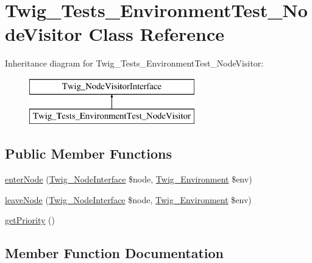 \hypertarget{classTwig__Tests__EnvironmentTest__NodeVisitor}{}\section{Twig\+\_\+\+Tests\+\_\+\+Environment\+Test\+\_\+\+Node\+Visitor Class Reference}
\label{classTwig__Tests__EnvironmentTest__NodeVisitor}
Inheritance diagram for Twig\+\_\+\+Tests\+\_\+\+Environment\+Test\+\_\+\+Node\+Visitor\+:\begin{figure}[H]
\begin{center}
\leavevmode
\includegraphics[height=2.000000cm]{classTwig__Tests__EnvironmentTest__NodeVisitor}
\end{center}
\end{figure}
\subsection*{Public Member Functions}
\begin{DoxyCompactItemize}
\item 
\hyperlink{classTwig__Tests__EnvironmentTest__NodeVisitor_a1790c7b3d07b044e72bc94c59354f011}{enter\+Node} (\hyperlink{interfaceTwig__NodeInterface}{Twig\+\_\+\+Node\+Interface} \$node, \hyperlink{classTwig__Environment}{Twig\+\_\+\+Environment} \$env)
\item 
\hyperlink{classTwig__Tests__EnvironmentTest__NodeVisitor_a70af2e2caea2f7b4a83b2fbc9c8b14af}{leave\+Node} (\hyperlink{interfaceTwig__NodeInterface}{Twig\+\_\+\+Node\+Interface} \$node, \hyperlink{classTwig__Environment}{Twig\+\_\+\+Environment} \$env)
\item 
\hyperlink{classTwig__Tests__EnvironmentTest__NodeVisitor_ac191997f646f41a3e6b06e5b5e875afd}{get\+Priority} ()
\end{DoxyCompactItemize}


\subsection{Member Function Documentation}
